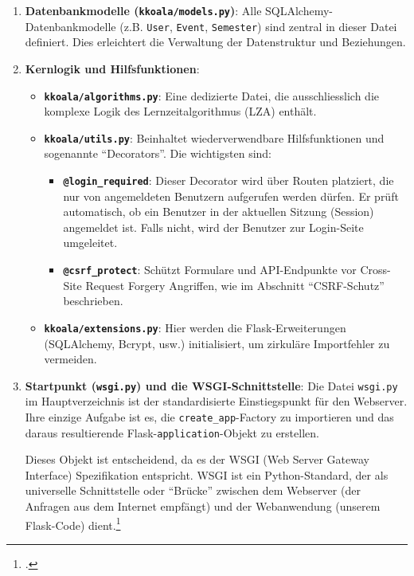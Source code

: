 \documentclass[12pt,a4paper]{report}
\begin{document}
\begin{enumerate}
    \item \textbf{Datenbankmodelle (\texttt{kkoala/models.py})}:
    Alle SQLAlchemy-Datenbankmodelle (z.B. \texttt{User}, \texttt{Event}, \texttt{Semester}) sind zentral in dieser Datei definiert. Dies erleichtert die Verwaltung der Datenstruktur und Beziehungen.

    \item \textbf{Kernlogik und Hilfsfunktionen}:
    \begin{itemize}
        \item \textbf{\texttt{kkoala/algorithms.py}}: Eine dedizierte Datei, die ausschliesslich die komplexe Logik des Lernzeitalgorithmus (LZA) enthält.
        \item \textbf{\texttt{kkoala/utils.py}}: Beinhaltet wiederverwendbare Hilfsfunktionen und sogenannte \enquote{Decorators}. Die wichtigsten sind:
    \begin{itemize}
        \item \textbf{\texttt{@login\_required}}: Dieser Decorator wird über Routen platziert, die nur von angemeldeten Benutzern aufgerufen werden dürfen. Er prüft automatisch, ob ein Benutzer in der aktuellen Sitzung (Session) angemeldet ist. Falls nicht, wird der Benutzer zur Login-Seite umgeleitet. 
        \item \textbf{\texttt{@csrf\_protect}}: Schützt Formulare und API-Endpunkte vor Cross-Site Request Forgery Angriffen, wie im Abschnitt \enquote{CSRF-Schutz} beschrieben.
    \end{itemize}
        \item \textbf{\texttt{kkoala/extensions.py}}: Hier werden die Flask-Erweiterungen (SQLAlchemy, Bcrypt, usw.) initialisiert, um zirkuläre Importfehler zu vermeiden.
    \end{itemize}
    
    \item \textbf{Startpunkt (\texttt{wsgi.py}) und die WSGI-Schnittstelle}:
    Die Datei \texttt{wsgi.py} im Hauptverzeichnis ist der standardisierte Einstiegspunkt für den Webserver. Ihre einzige Aufgabe ist es, die \texttt{create\_app}-Factory zu importieren und das daraus resultierende Flask-\texttt{application}-Objekt zu erstellen.

    Dieses Objekt ist entscheidend, da es der WSGI (Web Server Gateway Interface) Spezifikation entspricht. WSGI ist ein Python-Standard, der als universelle Schnittstelle oder \enquote{Brücke} zwischen dem Webserver (der Anfragen aus dem Internet empfängt) und der Webanwendung (unserem Flask-Code) dient.\footcite{chaitanya_srivastav_wsgi}


\end{enumerate}
\end{document}
